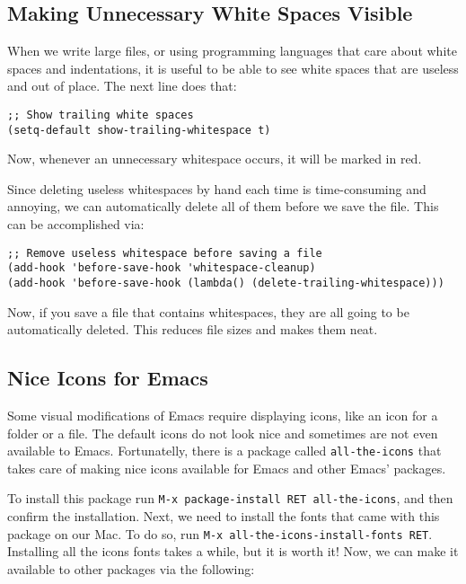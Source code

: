 \documentclass[12pt, a4paper]{article}
\begin{document}
\subsection{Making Unnecessary White Spaces Visible}
\label{sec:org7e9e1cd}

When we write large files, or using programming languages that care about white spaces and indentations, it is useful to be able to see white spaces that are useless and out of place. The next line does that:

\lstset{language=Lisp,label= ,caption= ,captionpos=b,numbers=none}
\begin{lstlisting}
;; Show trailing white spaces
(setq-default show-trailing-whitespace t)
\end{lstlisting}

Now, whenever an unnecessary whitespace occurs, it will be marked in red.

Since deleting useless whitespaces by hand each time is time-consuming and annoying, we can automatically delete all of them before we save the file. This can be accomplished via:

\lstset{language=Lisp,label= ,caption= ,captionpos=b,numbers=none}
\begin{lstlisting}
;; Remove useless whitespace before saving a file
(add-hook 'before-save-hook 'whitespace-cleanup)
(add-hook 'before-save-hook (lambda() (delete-trailing-whitespace)))
\end{lstlisting}

Now, if you save a file that contains whitespaces, they are all going to be automatically deleted. This reduces file sizes and makes them neat.

\subsection{Nice Icons for Emacs}
\label{sec:org6b6e0ee}

Some visual modifications of Emacs require displaying icons, like an icon for a folder or a file. The default icons do not look nice and sometimes are not even available to Emacs. Fortunatelly, there is a package called \texttt{all-the-icons} that takes care of making nice icons available for Emacs and other Emacs' packages.

To install this package run \texttt{M-x package-install RET all-the-icons}, and then confirm the installation. Next, we need to install the fonts that came with this package on our Mac. To do so, run \texttt{M-x all-the-icons-install-fonts RET}. Installing all the icons fonts takes a while, but it is worth it! Now, we can make it available to other packages via the following:
\end{document}
